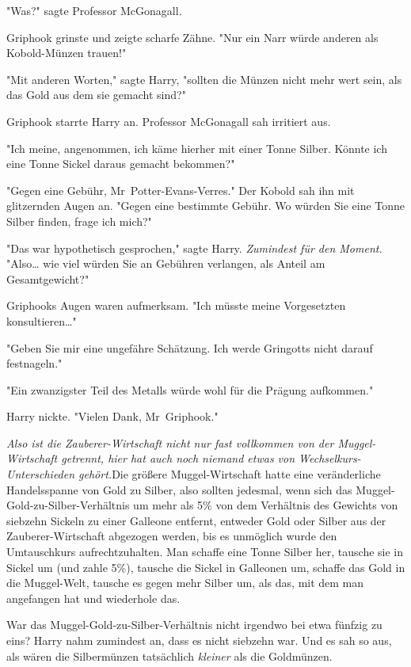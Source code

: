 {"Was?" sagte Professor McGonagall.

Griphook grinste und zeigte scharfe Zähne. "Nur ein Narr würde anderen als Kobold-Münzen trauen!"

"Mit anderen Worten," sagte Harry, "sollten die Münzen nicht mehr wert sein, als das Gold aus dem sie gemacht sind?"

Griphook starrte Harry an. Professor McGonagall sah irritiert aus.

"Ich meine, angenommen, ich käme hierher mit einer Tonne Silber. Könnte ich eine Tonne Sickel daraus gemacht bekommen?"

"Gegen eine Gebühr, Mr~Potter-Evans-Verres." Der Kobold sah ihn mit glitzernden Augen an. "Gegen eine bestimmte Gebühr. Wo würden Sie eine Tonne Silber finden, frage ich mich?"

"Das war hypothetisch gesprochen," sagte Harry. \emph{Zumindest für den Moment.} "Also… wie viel würden Sie an Gebühren verlangen, als Anteil am Gesamtgewicht?"

Griphooks Augen waren aufmerksam. "Ich müsste meine Vorgesetzten konsultieren…"

"Geben Sie mir eine ungefähre Schätzung. Ich werde Gringotts nicht darauf festnageln."

"Ein zwanzigster Teil des Metalls würde wohl für die Prägung aufkommen."

Harry nickte. "Vielen Dank, Mr~Griphook."

\emph{Also ist die Zauberer-Wirtschaft nicht nur fast vollkommen von der Muggel-Wirtschaft getrennt, hier hat auch noch niemand etwas von Wechselkurs-Unterschieden gehört.}Die größere Muggel-Wirtschaft hatte eine veränderliche Handelsspanne von Gold zu Silber, also sollten jedesmal, wenn sich das Muggel-Gold-zu-Silber-Verhältnis um mehr als 5\% von dem Verhältnis des Gewichts von siebzehn Sickeln zu einer Galleone entfernt, entweder Gold oder Silber aus der Zauberer-Wirtschaft abgezogen werden, bis es unmöglich wurde den Umtauschkurs aufrechtzuhalten. Man schaffe eine Tonne Silber her, tausche sie in Sickel um (und zahle 5\%), tausche die Sickel in Galleonen um, schaffe das Gold in die Muggel-Welt, tausche es gegen mehr Silber um, als das, mit dem man angefangen hat und wiederhole das.

War das Muggel-Gold-zu-Silber-Verhältnis nicht irgendwo bei etwa fünfzig zu eins? Harry nahm zumindest an, dass es nicht siebzehn war. Und es sah so aus, als wären die Silbermünzen tatsächlich \emph{kleiner} als die Goldmünzen.

}
